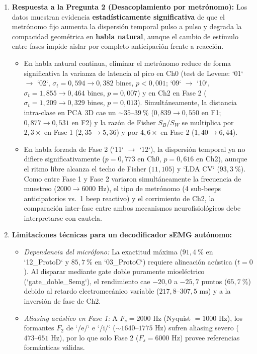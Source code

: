 \documentclass[11pt,a4paper]{article}
\begin{document}
\begin{enumerate}
    \item \textbf{Respuesta a la Pregunta 2 (Desacoplamiento por metr\'onomo):} Los datos muestran evidencia \textbf{estad\'isticamente significativa} de que el metr\'onomo fijo aumenta la dispersi\'on temporal pulso a pulso y degrada la compacidad geom\'etrica en \textbf{habla natural}, aunque el cambio de est\'imulo entre fases impide aislar por completo anticipaci\'on frente a reacci\'on.
    \begin{itemize}
        \item En habla natural continua, eliminar el metr\'onomo reduce de forma significativa la varianza de latencia al pico en Ch0 (test de Levene: `01` $\to$ `02`, $\sigma_t = 0{,}594 \to 0{,}382$ bines, $p < 0{,}001$; `09` $\to$ `10`, $\sigma_t = 1{,}855 \to 0{,}464$ bines, $p = 0{,}007$) y en Ch2 en Fase 2 ($\sigma_t = 1{,}209 \to 0{,}329$ bines, $p = 0{,}013$). Simult\'aneamente, la distancia intra-clase en PCA 3D cae un $\sim 35\text{--}39\ \%$ ($0{,}839 \to 0{,}550$ en F1; $0{,}877 \to 0{,}531$ en F2) y la raz\'on de Fisher $S_B/S_W$ se multiplica por $2{,}3\times$ en Fase 1 ($2{,}35 \to 5{,}36$) y por $4{,}6\times$ en Fase 2 ($1{,}40 \to 6{,}44$).
        \item En habla forzada de Fase 2 (`11` $\to$ `12`), la dispersi\'on temporal ya no difiere significativamente ($p = 0{,}773$ en Ch0, $p = 0{,}616$ en Ch2), aunque el ritmo libre alcanza el techo de Fisher ($11{,}105$) y `LDA CV` ($93{,}3\ \%$). Como entre Fase 1 y Fase 2 variaron simult\'aneamente la frecuencia de muestreo ($2000 \to 6000\text{ Hz}$), el tipo de metr\'onomo (4 sub-beeps anticipatorios vs.\ 1 beep reactivo) y el corrimiento de Ch2, la comparaci\'on inter-fase entre ambos mecanismos neurofisiol\'ogicos debe interpretarse con cautela.
    \end{itemize}

    \item \textbf{Limitaciones t\'ecnicas para un decodificador sEMG aut\'onomo:}
    \begin{itemize}
        \item \textit{Dependencia del micr\'ofono:} La exactitud m\'axima ($91{,}4\ \%$ en `12\_ProtoD` y $85{,}7\ \%$ en `03\_ProtoC`) requiere alineaci\'on ac\'ustica ($t=0$). Al disparar mediante gate doble puramente mioel\'ectrico (`gate\_doble\_Semg`), el rendimiento cae $-20{,}0$ a $-25{,}7$ puntos ($65{,}7\ \%$) debido al retardo electromec\'anico variable ($217{,}8\text{--}307{,}5\text{ ms}$) y a la inversi\'on de fase de Ch2.
        \item \textit{Aliasing ac\'ustico en Fase 1:} A $F_s = 2000\text{ Hz}$ (Nyquist $= 1000\text{ Hz}$), los formantes $F_2$ de `/e/` e `/i/` ($\sim 1640\text{--}1775\text{ Hz}$) sufren aliasing severo ($473\text{--}651\text{ Hz}$), por lo que solo Fase 2 ($F_s = 6000\text{ Hz}$) provee referencias form\'anticas v\'alidas.
    \end{itemize}
\end{enumerate}
\end{document}
